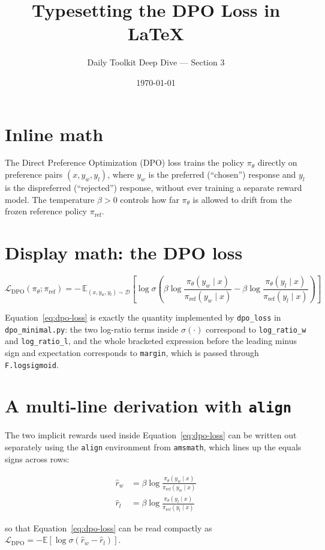 \documentclass[11pt]{article}
\title{Typesetting the DPO Loss in \LaTeX}
\author{Daily Toolkit Deep Dive --- Section 3}
\date{\today}
\begin{document}
\maketitle

\section{Inline math}

The Direct Preference Optimization (DPO) loss trains the policy
$\pi_\theta$ directly on preference pairs $(x, y_w, y_l)$, where $y_w$
is the preferred (``chosen'') response and $y_l$ is the dispreferred
(``rejected'') response, without ever training a separate reward
model. The temperature $\beta > 0$ controls how far $\pi_\theta$ is
allowed to drift from the frozen reference policy $\pi_{\text{ref}}$.

\section{Display math: the DPO loss}

\begin{equation}
  \label{eq:dpo-loss}
  \mathcal{L}_{\text{DPO}}(\pi_\theta; \pi_{\text{ref}}) =
  -\, \mathbb{E}_{(x, y_w, y_l) \sim \mathcal{D}}
  \left[
    \log \sigma \left(
      \beta \log \frac{\pi_\theta(y_w \mid x)}{\pi_{\text{ref}}(y_w \mid x)}
      - \beta \log \frac{\pi_\theta(y_l \mid x)}{\pi_{\text{ref}}(y_l \mid x)}
    \right)
  \right]
\end{equation}

Equation~\eqref{eq:dpo-loss} is exactly the quantity implemented by
\texttt{dpo\_loss} in \texttt{dpo\_minimal.py}: the two log-ratio
terms inside $\sigma(\cdot)$ correspond to \texttt{log\_ratio\_w} and
\texttt{log\_ratio\_l}, and the whole bracketed expression before the
leading minus sign and expectation corresponds to \texttt{margin},
which is passed through \texttt{F.logsigmoid}.

\section{A multi-line derivation with \texttt{align}}

The two implicit rewards used inside Equation~\eqref{eq:dpo-loss} can
be written out separately using the \texttt{align} environment from
\texttt{amsmath}, which lines up the equals signs across rows:

\begin{align}
  \hat r_w &= \beta \log \frac{\pi_\theta(y_w \mid x)}{\pi_{\text{ref}}(y_w \mid x)} \\
  \hat r_l &= \beta \log \frac{\pi_\theta(y_l \mid x)}{\pi_{\text{ref}}(y_l \mid x)}
\end{align}

so that Equation~\eqref{eq:dpo-loss} can be read compactly as
$\mathcal{L}_{\text{DPO}} = -\mathbb{E}[\log \sigma(\hat r_w - \hat r_l)]$.
\end{document}
